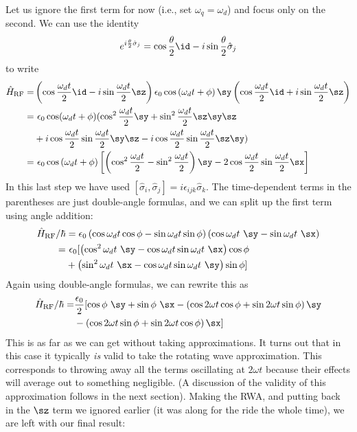 Let us ignore the first term for now (i.e., set $\omega_q=\omega_d$) and focus only on the second. We can use the identity 
\begin{equation}
\label{eq:rotationop}
    e^{i\frac{\theta}{2}\hat{\sigma}_j} = \cos{\frac{\theta}{2}}\id - i \sin{\frac{\theta}{2}}\hat{\sigma}_j
\end{equation}
to write
\begin{align}
    \hat{H}_\mathrm{RF} =& \left(\cos{\frac{\omega_d t}{2}}\id - i \sin{\frac{\omega_d t}{2}}\sz\right) \epsilon_0 \cos\left(\omega_d t + \phi\right) \sy \left(\cos{\frac{\omega_d t}{2}}\id + i \sin{\frac{\omega_d t}{2}}\sz\right) \notag \\ 
    =& \ \epsilon_0\cos(\omega_d t + \phi)(\cos^2{\frac{\omega_d t}{2}} \sy + \sin^2{\frac{\omega_d t}{2}}\sz\sy\sz \notag \\
    &+ i\cos\frac{\omega_d t}{2}\sin\frac{\omega_d t}{2}\sy\sz - i\cos\frac{\omega_d t}{2}\sin\frac{\omega_d t}{2}\sz\sy) \notag \\
    =& \ \epsilon_0 \cos\left(\omega_d t + \phi\right)
    \left[\left(\cos^2\frac{\omega_d t}{2} - \sin^2 \frac{\omega_d t}{2}\right)\sy- 2\cos\frac{\omega_d t}{2}\sin\frac{\omega_d t}{2} \sx\right]\notag
\end{align}
In this last step we have used $[\hat{\sigma}_i,\hat{\sigma}_j]=i\epsilon_{ijk}\hat \sigma_k$. The time-dependent terms in the parentheses are just double-angle formulas, and we can split up the first term using angle addition:
\begin{align*}
    \hat{H}_\mathrm{RF}/\hbar &= \epsilon_0\left(\cos\omega_d t\cos\phi - \sin \omega_d t \sin\phi\right)\left(\cos\omega_d t \ \sy - \sin \omega_d t \ \sx\right) \\
    =& \ \epsilon_0 [\left(\cos^2\omega_d t \ \sy - \cos\omega_d t \sin\omega_d t \ \sx \right)\cos\phi\\
    &+ \left(\sin^2\omega_d t \ \sx - \cos\omega_d t \sin\omega_d t \ \sy \right)\sin\phi]
\end{align*}
Again using double-angle formulas, we can rewrite this as
\begin{align*}
    \hat{H}_\mathrm{RF}/\hbar =& \frac{\epsilon_0}{2} [\cos\phi \ \sy + \sin\phi \ \sx - \left(\cos2\omega t \cos\phi + \sin2\omega t \sin \phi\right)\sy\\
    &- \left(\cos2\omega t \sin\phi + \sin2\omega t \cos \phi\right)\sx ] 
\end{align*}
This is as far as we can get without taking approximations. It turns out that in this case it typically \textit{is} valid to take the rotating wave approximation. This corresponds to throwing away all the terms oscillating at $2\omega t$ because their effects will average out to something negligible. (A discussion of the validity of this approximation follows in the next section). Making the RWA, and putting back in the $\sz$ term we ignored earlier (it was along for the ride the whole time), we are left with our final result:
